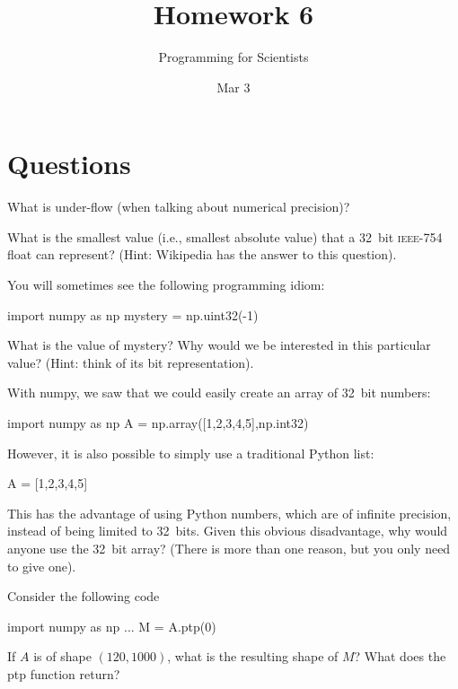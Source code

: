 
\author{Programming for Scientists}
\title{Homework 6}
\date{Mar 3}

\maketitle

\chapter{Questions}

\question %
What is under-flow (when talking about numerical precision)?

\question %
What is the smallest value (i.e., smallest absolute value) that a 32~bit \textsc{ieee-754} float can represent? (Hint: Wikipedia has the answer to this question).

\question %
You will sometimes see the following programming idiom:

\begin{python}
import numpy as np
mystery = np.uint32(-1)
\end{python}

What is the value of mystery? Why would we be interested in this particular value? (Hint: think of its bit representation).

\question %
With numpy, we saw that we could easily create an array of 32~bit numbers:

\begin{python}
import numpy as np
A = np.array([1,2,3,4,5],np.int32)
\end{python}

However, it is also possible to simply use a traditional Python list:

\begin{python}
A = [1,2,3,4,5]
\end{python}

This has the advantage of using Python numbers, which are of infinite precision, instead of being limited to 32~bits. Given this obvious disadvantage, why would anyone use the 32~bit array? (There is more than one reason, but you only need to give one).

\question %
Consider the following code

\begin{python}
import numpy as np
...
M = A.ptp(0)
\end{python}

If $A$ is of shape $(120,1000)$, what is the resulting shape of $M$? What does the ptp function return?

